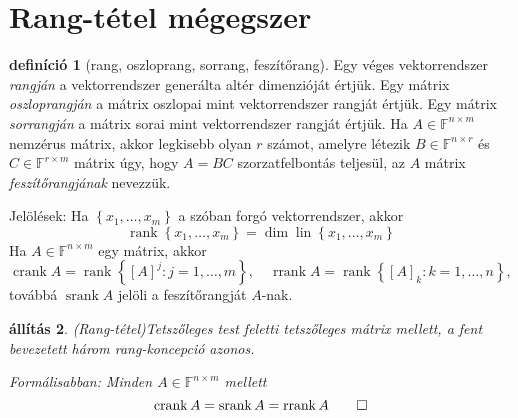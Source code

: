 \documentclass[9pt, showtrims]{memoir}
\theoremstyle{plain}
\newtheorem{proposition}{állítás}[section]
\theoremstyle{remark}
\theoremstyle{definition}
\newtheorem{definition}[proposition]{definíció}
\DeclareMathOperator{\lin}{lin}
\DeclareMathOperator{\crank}{crank}
\DeclareMathOperator{\rrank}{rrank}
\DeclareMathOperator{\srank}{srank}
\DeclareMathOperator{\rank}{rank}
\begin{document}
\chapter*{Rang-tétel mégegszer}

\begin{definition}[rang, oszloprang, sorrang, feszítőrang]
    Egy véges vektorrendszer \emph{rangján} a vektorrendszer generálta altér dimenzióját értjük.
    Egy mátrix \emph{oszloprangján} a mátrix oszlopai mint vektorrendszer rangját értjük.
    Egy mátrix \emph{sorrangján} a mátrix sorai mint vektorrendszer rangját értjük.
    Ha $A\in\mathbb{F}^{n\times m}$ nemzérus mátrix,
    akkor legkisebb olyan $r$ számot, amelyre
    létezik $B\in\mathbb{F}^{n\times r}$ és $C\in\mathbb{F}^{r\times m}$ mátrix úgy, hogy 
    $A=BC$ szorzatfelbontás teljesül,
    az $A$ mátrix \emph{feszítőrangjának} nevezzük.

    Jelölések: Ha $\left\{ x_1,\dots,x_m \right\}$ a szóban forgó vektorrendszer, akkor
    \[
        \rank\left\{ x_1,\dots,x_m \right\}=\dim\lin\left\{ x_1,\dots,x_m \right\}
    \]
    Ha $A\in\mathbb{F}^{n\times m}$ egy mátrix,
    akkor 
    \[
        \crank{A}=\rank\left\{ [A]^{j}:j=1,\dots,m \right\},
        \quad
        \rrank{A}=\rank\left\{ [A]_k:k=1,\dots,n\right\},
    \]
    továbbá $\srank{A}$ jelöli a feszítőrangját $A$-nak.
\end{definition}
\begin{proposition}(Rang-tétel)\label{pr:rang}
    Tetszőleges test feletti tetszőleges mátrix mellett, a fent bevezetett három rang-koncepció azonos.

    Formálisabban: Minden $A\in\mathbb{F}^{n\times m}$ mellett
    \[
        \crank{A}=\srank{A}=\rrank{A}\qedhere
    \]
\end{proposition}
\end{document}
